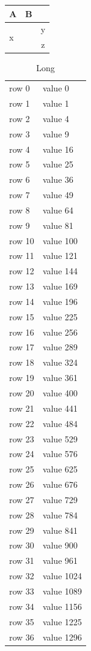 \documentclass{article}
\begin{document}
\begin{tabular}{l>{\raggedleft}p{2cm}c}\toprule
A & B \tabularnewline\midrule \multirow{2}{*}{x} & 1 & \cellcolor{yellow}y\tabularnewline & 2 & z\tabularnewline\bottomrule
\end{tabular}
\begin{longtable}{ll}\caption{Long}\\ \hline
\endhead
row 0 & value 0\\
row 1 & value 1\\
row 2 & value 4\\
row 3 & value 9\\
row 4 & value 16\\
row 5 & value 25\\
row 6 & value 36\\
row 7 & value 49\\
row 8 & value 64\\
row 9 & value 81\\
row 10 & value 100\\
row 11 & value 121\\
row 12 & value 144\\
row 13 & value 169\\
row 14 & value 196\\
row 15 & value 225\\
row 16 & value 256\\
row 17 & value 289\\
row 18 & value 324\\
row 19 & value 361\\
row 20 & value 400\\
row 21 & value 441\\
row 22 & value 484\\
row 23 & value 529\\
row 24 & value 576\\
row 25 & value 625\\
row 26 & value 676\\
row 27 & value 729\\
row 28 & value 784\\
row 29 & value 841\\
row 30 & value 900\\
row 31 & value 961\\
row 32 & value 1024\\
row 33 & value 1089\\
row 34 & value 1156\\
row 35 & value 1225\\
row 36 & value 1296\\

\end{longtable}
\end{document}
